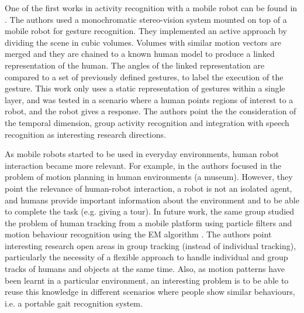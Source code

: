 One of the first works in activity recognition with a mobile robot can be found in \citep{Kortenkamp1996_RIG,Bonasso96recognizingand}. 
The authors used a monochromatic stereo-vision system mounted on top of a mobile robot for gesture recognition.
They implemented an active approach by dividing the scene in cubic volumes.
Volumes with similar motion vectors are merged and they are chained to a known human model to produce a linked representation of the human.
The angles of the linked representation are compared to a set of previously defined gestures, to label the execution of the gesture.
This work only uses a static representation of gestures within a single layer, and was tested in a scenario where a human points regions of interest to a robot, and the robot gives a response.
The authors point the the consideration of the temporal dimension, group activity recognition and integration with speech recognition as interesting research directions.

As mobile robots started to be used in everyday environments, human robot interaction became more relevant. 
For example, in \citep{Burgard98_ExpMuseumRobot} the authors focused in the problem of motion planning in human environments (a museum). 
However, they point the relevance of human-robot interaction, a robot is not an isolated agent, and humans provide important information about the environment and to be able to complete the task (e.g. giving a tour). 
In future work, the same group studied the problem of human tracking from a mobile platform using particle filters \citep{Schulz01_TrackingMultipleMoving,Schulz03_PeopleTrackSJPDAF} and motion behaviour recognition using the EM algorithm \citep{BennewitzBT02,bennewitz2004active}.
The authors point interesting research open areas in group tracking (instead of individual tracking), particularly the necessity of a flexible approach to handle individual and group tracks of humans and objects at the same time.
Also, as motion patterns have been learnt in a particular environment, an interesting problem is to be able to reuse this knowledge in different scenarios where people show similar behaviours, i.e. a portable gait recognition system.

